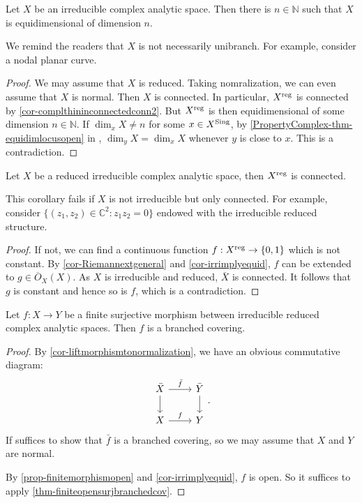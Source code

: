 \begin{corollary}\label{cor-irrimplyequid}
    Let $X$ be an irreducible complex analytic space. Then there is $n\in \mathbb{N}$ such that $X$ is equidimensional of dimension $n$.
\end{corollary}
We remind the readers that $X$ is not necessarily unibranch. For example, consider a nodal planar curve.
\begin{proof}
    We may assume that $X$ is reduced. Taking nomralization, we can even assume that $X$ is normal. Then $X$ is connected. In particular, $X^{\operatorname{reg}}$ is connected by \cref{cor-complthininconnectedconn2}. But $X^{\operatorname{reg}}$ is then equidimensional of some dimension $n\in \mathbb{N}$. If $\dim_x X\neq n$ for some $x\in X^{\operatorname{Sing}}$, by \cref{PropertyComplex-thm-equidimlocusopen} in , $\dim_y X=\dim_x X$ whenever $y$ is close to $x$. This is a contradiction.
\end{proof}

\begin{corollary}\label{cor-irredregularconnected}
    Let $X$ be a reduced irreducible complex analytic space, then $X^{\operatorname{reg}}$ is connected.
\end{corollary}
This corollary fails if $X$ is not irreducible but only connected. For example, consider $\{(z_1,z_2)\in \mathbb{C}^2:z_1z_2=0\}$ endowed with the irreducible reduced structure.
\begin{proof}
    If not, we can find a continuous function $f:X^{\operatorname{reg}}\rightarrow \{0,1\}$ which is not constant. By \cref{cor-Riemannextgeneral} and \cref{cor-irrimplyequid}, $f$ can be extended to $g\in \overline{O}_X(X)$. As $X$ is irreducible and reduced, $\bar{X}$ is connected. It follows that $g$ is constant and hence so is $f$, which is a contradiction.
\end{proof}




\begin{corollary}\label{cor-finitesurjbranchedcov2}
    Let $f:X\rightarrow Y$ be a finite surjective morphism between irreducible reduced complex analytic spaces. Then $f$ is a branched covering.
\end{corollary}
\begin{proof}
    By \cref{cor-liftmorphismtonormalization}, we have an obvious commutative diagram:
    \[
        \begin{tikzcd}
            \bar{X} \arrow[d] \arrow[r, "\bar{f}"] & \bar{Y} \arrow[d] \\
            X \arrow[r, "f"]                       & Y                
        \end{tikzcd}.  
    \]
    If suffices to show that $\bar{f}$ is a branched covering, so we may assume that $X$ and $Y$ are normal.

    By \cref{prop-finitemorphismopen} and \cref{cor-irrimplyequid}, $f$ is open. So it suffices to apply \cref{thm-finiteopensurjbranchedcov}.
\end{proof}


